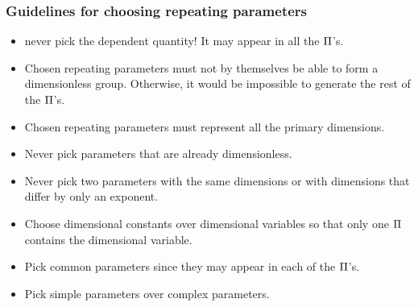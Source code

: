 \subsubsection{Guidelines for choosing repeating parameters}
\begin{itemize}
%
\item never pick the dependent quantity! It may appear in all the $\Pi$'s.
%
\item Chosen repeating parameters must not by themselves be able to form a dimensionless group. Otherwise, it would be impossible to generate the rest of the $\Pi$'s.
%
\item Chosen repeating parameters must represent all the primary dimensions.
%
\item Never pick parameters that are already dimensionless.
%
\item Never pick two parameters with the same dimensions or with dimensions that differ by only an exponent.
%
\item Choose dimensional constants over dimensional variables so that only one $\Pi$ contains the dimensional variable.
%
\item Pick common parameters since they may appear in each of the $\Pi$'s.
%
\item Pick simple parameters over complex parameters.
%
\end{itemize}



